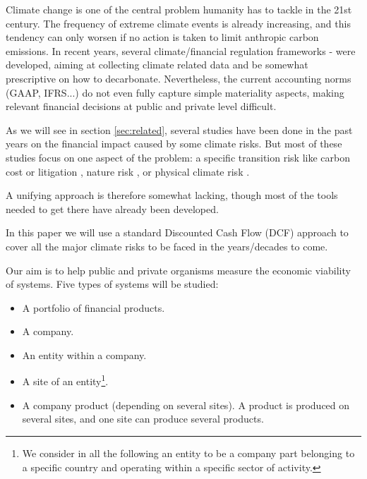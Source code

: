 Climate change is one of the central problem humanity has to tackle in the 21st century. The frequency of extreme climate events is already increasing, and this tendency can only worsen if no action is taken to limit anthropic carbon emissions. In recent years, several climate/financial regulation frameworks \cite{EUC}-\cite{Deloitte} were developed, aiming at collecting climate related data and be somewhat prescriptive \cite{EuropeanClimateLaw} on how to decarbonate. Nevertheless, the current accounting norms (GAAP, IFRS...) do not even fully capture simple materiality aspects, making relevant financial decisions at public and private level difficult.

\vspace{0.2cm}

As we will see in section \ref{sec:related}, several studies have been done in the past years on the financial impact  caused by some climate risks. But most of these studies focus on one aspect of the problem: a specific transition risk \cite{Transition1} like carbon cost \cite{Adenot}\cite{RoncalliCC} or litigation \cite{Litigation1}\cite{Litigation2}, nature risk \cite{NatureF1}\cite{NatureF2}\cite{NatureF3}\cite{RoncallliBiodivBook}\cite{RoncalliNatureCap}, or physical climate risk \cite{LeGuenedal}. 


\vspace{0.2cm}

A unifying approach is therefore somewhat lacking, though most of the tools needed to get there have already been developed. 

\vspace{0.2cm}

In this paper we will use a standard Discounted Cash Flow (DCF) approach to cover all the major climate risks to be faced in the years/decades to come.

\vspace{0.2cm}

Our aim is to help public and private organisms measure the economic viability of systems. Five types of systems will be studied: 
\begin{itemize}
\item[•] A portfolio of financial products.
\item[•] A company.
\item[•] An entity within a company.
\item[•] A site of an entity\footnote{We consider in all the following an entity to be a company part belonging to a specific country and operating within a specific sector of activity.}.
\item[•] A company product (depending on several sites). A product is produced on several sites, and one site can produce several products.
\end{itemize}

